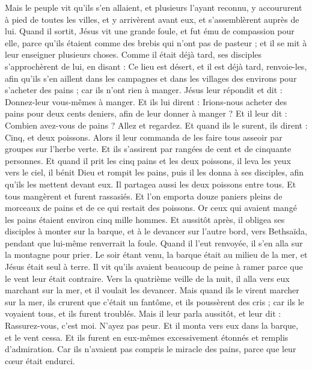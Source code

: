 \begin{multicols}{2}
Mais le peuple vit qu'ils s'en allaient, et plusieurs l'ayant reconnu, y accoururent à pied de toutes les villes, et y arrivèrent avant eux, et s'assemblèrent auprès de lui.
Quand il sortit, Jésus vit une grande foule, et fut ému de compassion pour elle, parce qu'ils étaient comme des brebis qui n'ont pas de pasteur ; et il se mit à leur enseigner plusieurs choses.
Comme il était déjà tard, ses disciples s'approchèrent de lui, en disant : Ce lieu est désert, et il est déjà tard,
renvoie-les, afin qu'ils s'en aillent dans les campagnes et dans les villages des environs pour s'acheter des pains ; car ils n'ont rien à manger.
Jésus leur répondit et dit : Donnez-leur vous-mêmes à manger. Et ils lui dirent : Irions-nous acheter des pains pour deux cents deniers, afin de leur donner à manger ?
Et il leur dit : Combien avez-vous de pains ? Allez et regardez. Et quand ils le surent, ils dirent : Cinq, et deux poissons.
Alors il leur commanda de les faire tous asseoir par groupes sur l'herbe verte.
Et ils s'assirent par rangées de cent et de cinquante personnes.
Et quand il prit les cinq pains et les deux poissons, il leva les yeux vers le ciel, il bénit Dieu et rompit les pains, puis il les donna à ses disciples, afin qu'ils les mettent devant eux. Il partagea aussi les deux poissons entre tous.
Et tous mangèrent et furent rassasiés.
Et l'on emporta douze paniers pleins de morceaux de pains et de ce qui restait des poissons.
Or ceux qui avaient mangé les pains étaient environ cinq mille hommes.
Et aussitôt après, il obligea ses disciples à monter sur la barque, et à le devancer sur l'autre bord, vers Bethsaïda, pendant que lui-même renverrait la foule.
Quand il l'eut renvoyée, il s'en alla sur la montagne pour prier.
Le soir étant venu, la barque était au milieu de la mer, et Jésus était seul à terre.
Il vit qu'ils avaient beaucoup de peine à ramer parce que le vent leur était contraire. Vers la quatrième veille de la nuit, il alla vers eux marchant sur la mer, et il voulait les devancer.
Mais quand ils le virent marcher sur la mer, ils crurent que c'était un fantôme, et ils poussèrent des cris ;
car ils le voyaient tous, et ils furent troublés. Mais il leur parla aussitôt, et leur dit : Rassurez-vous, c'est moi. N'ayez pas peur.
Et il monta vers eux dans la barque, et le vent cessa. Et ils furent en eux-mêmes excessivement étonnés et remplis d'admiration.
Car ils n'avaient pas compris le miracle des pains, parce que leur cœur était endurci.

\end{multicols}
